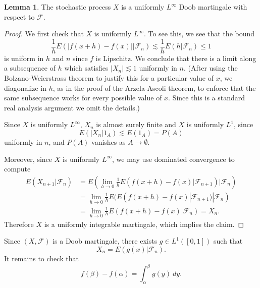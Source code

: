 \documentclass[10pt]{article}
\theoremstyle{definition}
\newtheorem{lemma}{Lemma}[exer]
\begin{document}
\begin{lemma}
The stochastic process $X$ is a uniformly $L^\infty$ Doob martingale with respect to $\mathcal F$.
\end{lemma}
\begin{proof}
We first check that $X$ is uniformly $L^\infty$.
To see this, we see that the bound
$$\frac{1}{h} E(|f(x + h) - f(x)||\mathcal F_n) \lesssim \frac{1}{h} E(h|\mathcal F_n) \leq 1$$
is uniform in $h$ and $n$ since $f$ is Lipschitz.
We conclude that there is a limit along a subsequence of $h$ which satisfies $|X_n| \lesssim 1$ uniformly in $n$.
(After using the Bolzano-Weierstrass theorem to justify this for a particular value of $x$, we diagonalize in $h$, as in the proof of the Arzela-Ascoli theorem, to enforce that the same subsequence works for every possible value of $x$.
Since this is a standard real analysis argument we omit the details.)

Since $X$ is uniformly $L^\infty$, $X_n$ is almost surely finite and $X$ is uniformly $L^1$, since
$$E(|X_n|1_A) \lesssim E(1_A) = P(A)$$
uniformly in $n$, and $P(A)$ vanishes as $A \to \emptyset$.

Moreover, since $X$ is uniformly $L^\infty$, we may use dominated convergence to compute
\begin{align*}
E(X_{n+1}|\mathcal F_n) &= E\left(\lim_{h \to 0} \frac{1}{h} E(f(x + h) - f(x)|\mathcal F_{n+1})\bigg|\mathcal F_n\right)\\
&= \lim_{h \to 0} \frac{1}{h} E(E(f(x + h) - f(x)|\mathcal F_{n+1})|\mathcal F_n)\\
&= \lim_{h \to 0} \frac{1}{h} E(f(x + h) - f(x)|\mathcal F_n) = X_n.
\end{align*}
Therefore $X$ is a uniformly integrable martingale, which implies the claim.
\end{proof}

Since $(X, \mathcal F)$ is a Doob martingale, there exists $g \in L^1([0, 1])$ such that
$$X_n = E(g(x)|\mathcal F_n).$$
It remains to check that
\begin{equation}
\label{absolute continuity}
f(\beta) - f(\alpha) = \int_\alpha^\beta g(y) ~dy.
\end{equation}
\end{document}
